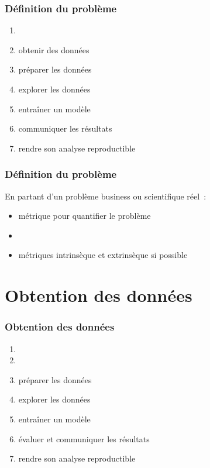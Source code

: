 \documentclass{formation}
\begin{document}
\begin{frame}
  \frametitle{Définition du problème}

  \begin{enumerate}
  \item {}
  \item obtenir des données
  \item préparer les données
  \item explorer les données
  \item entraîner un modèle
  \item communiquer les résultats
  \item rendre son analyse reproductible
  \end{enumerate}
\end{frame}

\begin{frame}
  \frametitle{Définition du problème}

  En partant d'un problème business ou scientifique réel :

  \begin{itemize}[<+->]
  \item métrique pour quantifier le problème
  \item {} 
  \item métriques intrinsèque et extrinsèque si possible
  \end{itemize}

\end{frame}

\section{Obtention des données}

\begin{frame}
  \frametitle{Obtention des données}

  \begin{enumerate}
  \item {}
  \item {}
  \item préparer les données
  \item explorer les données
  \item entraîner un modèle
  \item évaluer et communiquer les résultats
  \item rendre son analyse reproductible
  \end{enumerate}
\end{frame}
\end{document}
